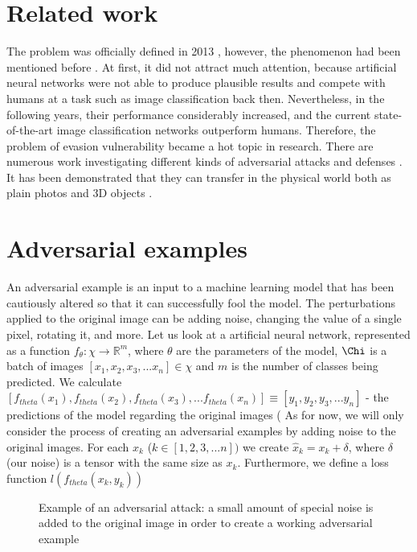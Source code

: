 \documentclass{article}
\begin{document}
\section{Related work}
The problem was officially defined in 2013 \cite{szegedy2013intriguing, Biggio_2013}, however, the phenomenon had been mentioned before \cite{dalvi, Kolcz2009FeatureWF, barreno}. At first, it did not attract much attention, because artificial neural networks were not able to produce plausible results and compete with humans at a task such as image classification back then. Nevertheless, in the following years, their performance considerably increased, and the current state-of-the-art image classification networks outperform humans. Therefore, the problem of evasion vulnerability became a hot topic in research. There are numerous work investigating different kinds of adversarial attacks \cite{goodfellow2014explaining, ilyas2018prior} and defenses \cite{aleks2017deep, xiao2018training}. It has been demonstrated that they can transfer in the physical world both as plain photos\cite{kurakin2016adversarial} and 3D objects \cite{athalye2017synthesizing}.

\newpage

\section{Adversarial examples}
An adversarial example is an input to a machine learning model that has been cautiously altered so that it can successfully fool the model. The perturbations applied to the original image can be adding noise, changing the value of a single pixel, rotating it, and more. Let us look at a artificial neural network, represented as a function $f_{\theta}:\chi \to \mathbb{R}^m$, where $\theta$ are the parameters of the model, $\Chi$ is a batch of images $[x_{1},x_{2},x_3{},...x_{n}] \in \chi$ and $m$ is the number of classes being predicted. We calculate $[f_{theta}(x_{1}),f_{theta}(x_{2}),f_{theta}(x_{3}),...f_{theta}(x_{n})] \equiv [y_{1},y_{2},y_{3},...y_{n}]$ - the predictions of the model regarding the original images ( As for now, we will only consider the process of creating an adversarial examples by adding noise to the original images. For each $x_{k}$ ($k \in [1, 2, 3,...n])$ we create $\hat{x}_{k} = x_{k} + \delta$, where $\delta$ (our noise) is a tensor with the same size as $x_{k}$. Furthermore, we define a loss function $l(f_{theta}(x_{k}, y_{k}))$

\begin{figure}[ht]
    \centering
    \hfill
    \caption{Example of an adversarial attack: a small amount of special noise is added to the original image in order to create a working adversarial example}
\end{figure}

\newpage


\end{document}

